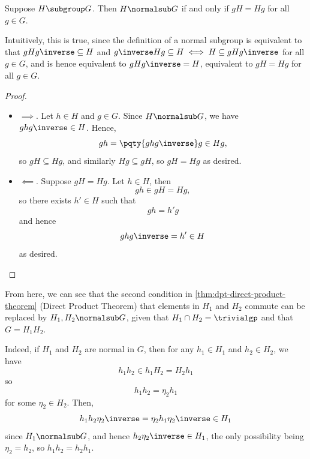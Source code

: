 \begin{lemma}
    \label{lem:left-right-coset-normal}%
    Suppose \(H \subgroup G\). Then \(H \normalsub G\) if and only if \(gH = Hg\) for all \(g \in G\).
\end{lemma}

Intuitively, this is true, since the definition of a normal subgroup is equivalent to that \(gHg\inverse \subseteq H\) and \(g\inverse H g \subseteq H \iff H \subseteq g H g\inverse\) for all \(g \in G\), and is hence equivalent to \(gHg\inverse = H\), equivalent to \(gH = Hg\) for all \(g \in G\).

\begin{proof}
    \begin{itemize}
        \item \(\implies\). Let \(h \in H\) and \(g \in G\). Since \(H\normalsub G\), we have \(g h g\inverse \in H\). Hence,
        \[
            gh = \pqty{ghg\inverse} g \in Hg,
        \]
        so \(gH \subseteq Hg\), and similarly \(Hg \subseteq gH\), so \(gH = Hg\) as desired.
        \item \(\impliedby\). Suppose \(gH = Hg\). Let \(h \in H\), then
        \[
            gh \in gH = Hg,
        \]
        so there exists \(h' \in H\) such that
        \[
            gh = h' g
        \]
        and hence
        \[
            ghg\inverse = h' \in H
        \]
        as desired.
    \end{itemize}
\end{proof}

From here, we can see that the second condition in \autoref{thm:dpt-direct-product-theorem} (Direct Product Theorem) that elements in \(H_1\) and \(H_2\) commute can be replaced by \(H_1, H_2 \normalsub G\), given that \(H_1 \cap H_2 = \trivialgp\) and that \(G = H_1 H_2\).

Indeed, if \(H_1\) and \(H_2\) are normal in \(G\), then for any \(h_1 \in H_1\) and \(h_2 \in H_2\), we have
\[
    h_1 h_2 \in h_1 H_2 = H_2 h_1
\]
so
\[
    h_1 h_2 = \eta_2 h_1
\]
for some \(\eta_2 \in H_2\). Then,
\[
    h_1 h_2 \eta_2\inverse = \eta_2 h_1 \eta_2\inverse \in H_1
\]
since \(H_1 \normalsub G\), and hence \(h_2 \eta_2\inverse \in H_1\), the only possibility being \(\eta_2 = h_2\), so \(h_1 h_2 = h_2 h_1\).

